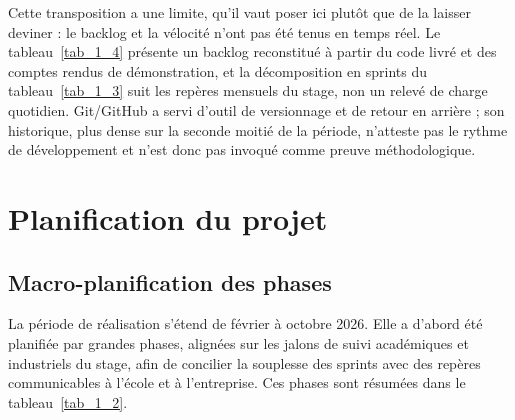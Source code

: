 Cette transposition a une limite, qu’il vaut poser ici plutôt que de la laisser deviner : le backlog et la vélocité n’ont pas été tenus en temps réel. Le tableau~\ref{tab_1_4} présente un backlog reconstitué à partir du code livré et des comptes rendus de démonstration, et la décomposition en sprints du tableau~\ref{tab_1_3} suit les repères mensuels du stage, non un relevé de charge quotidien. Git/GitHub a servi d’outil de versionnage et de retour en arrière ; son historique, plus dense sur la seconde moitié de la période, n’atteste pas le rythme de développement et n’est donc pas invoqué comme preuve méthodologique.

\section{Planification du projet}
\label{sec_1_8}
\subsection{Macro-planification des phases}
\label{sec_1_8_1}
La période de réalisation s’étend de février à octobre 2026. Elle a d’abord été planifiée par grandes phases, alignées sur les jalons de suivi académiques et industriels du stage, afin de concilier la souplesse des sprints avec des repères communicables à l’école et à l’entreprise. Ces phases sont résumées dans le tableau~\ref{tab_1_2}.

